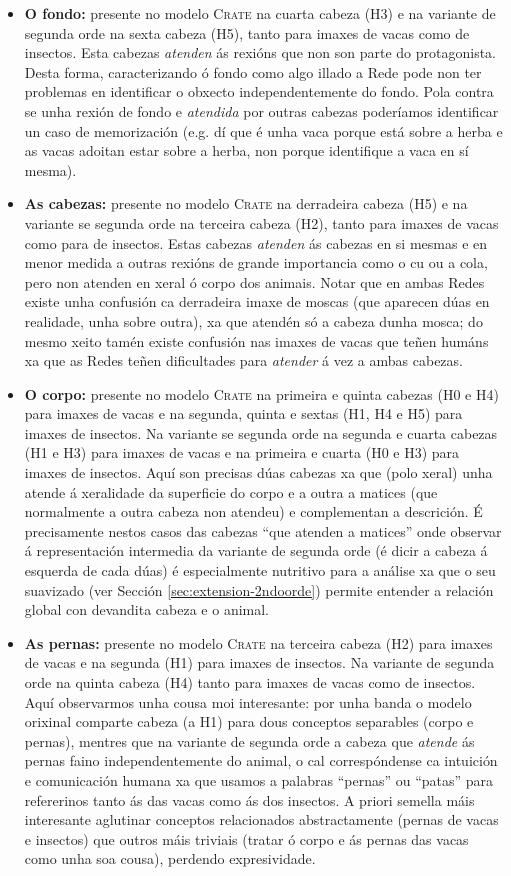 \begin{itemize}
				\item \textbf{O fondo:} presente no modelo \textsc{Crate} na cuarta cabeza (H3) e na variante de segunda orde na sexta cabeza (H5), tanto para imaxes de vacas como de insectos. Esta cabezas \emph{atenden} ás rexións que non son parte do protagonista. Desta forma, caracterizando ó fondo como algo illado a Rede pode non ter problemas en identificar o obxecto independentemente do fondo. Pola contra se unha rexión de fondo e \emph{atendida} por outras cabezas poderíamos identificar un caso de memorización (e.g. dí que é unha vaca porque está sobre a herba e as vacas adoitan estar sobre a herba, non porque identifique a vaca en sí mesma).
				\item \textbf{As cabezas:} presente no modelo \textsc{Crate} na derradeira cabeza (H5) e na variante se segunda orde na terceira cabeza (H2), tanto para imaxes de vacas como para de insectos. Estas cabezas \emph{atenden} ás cabezas en si mesmas e en menor medida a outras rexións de grande importancia como o cu ou a cola, pero non atenden en xeral ó corpo dos animais. Notar que en ambas Redes existe unha confusión ca derradeira imaxe de moscas (que aparecen dúas en realidade, unha sobre outra), xa que atendén só a cabeza dunha mosca; do mesmo xeito tamén existe confusión nas imaxes de vacas que teñen humáns xa que as Redes teñen dificultades para \emph{atender} á vez a ambas cabezas.
				\item \textbf{O corpo:} presente no modelo \textsc{Crate} na primeira e quinta cabezas (H0 e H4) para imaxes de vacas e na segunda, quinta e sextas (H1, H4 e H5) para imaxes de insectos. Na variante se segunda orde na segunda e cuarta cabezas (H1 e H3) para imaxes de vacas e na primeira e cuarta (H0 e H3) para imaxes de insectos. Aquí son precisas dúas cabezas xa que (polo xeral) unha atende á xeralidade da superficie do corpo e a outra a matices (que normalmente a outra cabeza non atendeu) e complementan a descrición. É precisamente nestos casos das cabezas ``que atenden a matices'' onde observar á representación intermedia da variante de segunda orde (é dicir a cabeza á esquerda de cada dúas) é especialmente nutritivo para a análise xa que o seu suavizado (ver Sección \ref{sec:extension-2ndoorde}) permite entender a relación global con devandita cabeza e o animal.
				\item \textbf{As pernas:} presente no modelo \textsc{Crate} na terceira cabeza (H2) para imaxes de vacas e na segunda (H1) para imaxes de insectos. Na variante de segunda orde na quinta cabeza (H4) tanto para imaxes de vacas como de insectos. Aquí observarmos unha cousa moi interesante: por unha banda o modelo orixinal comparte cabeza (a H1) para dous conceptos separables (corpo e pernas), mentres que na variante de segunda orde a cabeza que \emph{atende} ás pernas faino independentemente do animal, o cal correspóndense ca intuición e comunicación humana xa que usamos a palabras ``pernas'' ou ``patas'' para refererinos tanto ás das vacas como ás dos insectos. A priori semella máis interesante aglutinar conceptos relacionados abstractamente (pernas de vacas e insectos) que outros máis triviais (tratar ó corpo e ás pernas das vacas como unha soa cousa), perdendo expresividade.

\end{itemize}
